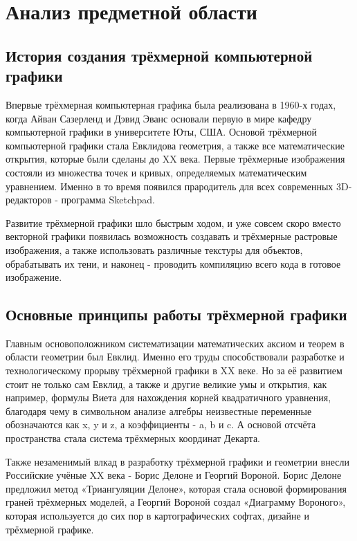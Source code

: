\section{Анализ предметной области}
\subsection{История создания трёхмерной компьютерной графики}

Впервые трёхмерная компьютерная графика была реализована в 1960-х годах, когда Айван Сазерленд и Дэвид Эванс основали первую в мире кафедру компьютерной графики в университете Юты, США. Основой трёхмерной компьютерной графики стала Евклидова геометрия, а также все математические открытия, которые были сделаны до XX века. Первые трёхмерные изображения состояли из множества точек и кривых, определяемых математическим уравнением. Именно в то время появился прародитель для всех современных 3D-редакторов - программа Sketchpad.

Развитие трёхмерной графики шло быстрым ходом, и уже совсем скоро вместо векторной графики появилась возможность создавать и трёхмерные растровые изображения, а также использовать различные текстуры для объектов, обрабатывать их тени, и наконец - проводить компиляцию всего кода в готовое изображение.
\subsection{Основные принципы работы трёхмерной графики}

Главным основоположником систематизации математических аксиом и теорем в области геометрии был Евклид. Именно его труды способствовали разработке и технологическому прорыву трёхмерной графики в XX веке. Но за её развитием стоит не только сам Евклид, а также и другие великие умы и открытия, как например, формулы Виета для нахождения корней квадратичного уравнения, благодаря чему в символьном анализе алгебры неизвестные переменные обозначаются как x, y и z, а коэффициенты - a, b и c. А основой отсчёта  пространства стала система трёхмерных координат Декарта.

Также незаменимый влкад в разработку трёхмерной графики и геометрии внесли Российские учёные XX века - Борис Делоне и Георгий Вороной. Борис Делоне предложил метод «Триангуляции Делоне», которая стала основой формирования граней трёхмерных моделей, а Георгий Вороной создал «Диаграмму Вороного», которая используется до сих пор в картографических софтах, дизайне и трёхмерной графике.

